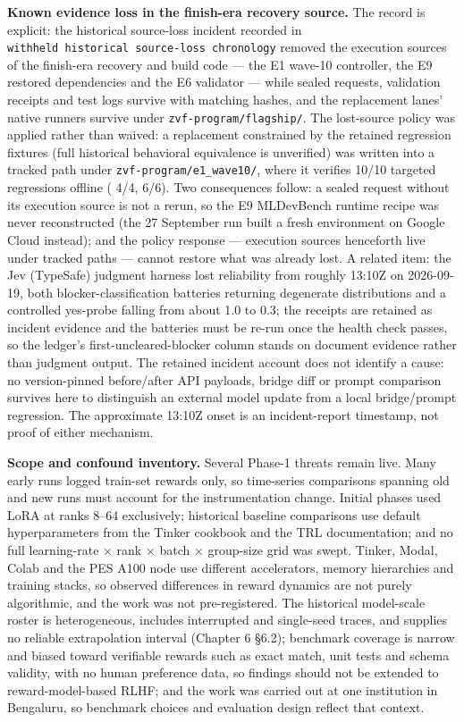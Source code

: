 \documentclass[12pt,a4paper]{report}
\DeclareRobustCommand{\longtok}[1]{\texttt{\seqsplit{#1}}}
\begin{document}
\textbf{Known evidence loss in the finish-era recovery source.} The
record is explicit: the historical source-loss incident recorded in
\texttt{withheld\ historical\ source-loss\ chronology} removed the
execution sources of the finish-era recovery and build code --- the E1
wave-10 controller, the E9 restored dependencies and the E6 validator
--- while sealed requests, validation receipts and test logs survive
with matching hashes, and the replacement lanes' native runners survive
under \texttt{zvf-program/flagship/}. The lost-source policy was applied
rather than waived: a replacement constrained by the retained regression
fixtures (full historical behavioral equivalence is unverified) was
written into a tracked path under \texttt{zvf-program/e1\_wave10/},
where it verifies 10/10 targeted regressions offline
(\longtok{test\_\allowbreak{}process\_\allowbreak{}group.py} 4/4,
\longtok{test\_\allowbreak{}cleanup\_\allowbreak{}regressions.py} 6/6). Two consequences follow: a
sealed request without its execution source is not a rerun, so the E9
MLDevBench runtime recipe was never reconstructed (the 27 September run
built a fresh environment on Google Cloud instead); and the policy
response --- execution sources henceforth live under tracked paths ---
cannot restore what was already lost. A related item: the Jev (TypeSafe)
judgment harness lost reliability from roughly 13:10Z on 2026-09-19,
both blocker-classification batteries returning degenerate distributions
and a controlled yes-probe falling from about 1.0 to 0.3; the receipts
are retained as incident evidence and the batteries must be re-run once
the health check passes, so the ledger's first-uncleared-blocker column
stands on document evidence rather than judgment output. The retained
incident account does not identify a cause: no version-pinned
before/after API payloads, bridge diff or prompt comparison survives
here to distinguish an external model update from a local bridge/prompt
regression. The approximate 13:10Z onset is an incident-report
timestamp, not proof of either mechanism.

\textbf{Scope and confound inventory.} Several Phase-1 threats remain
live. Many early runs logged train-set rewards only, so time-series
comparisons spanning old and new runs must account for the
instrumentation change. Initial phases used LoRA at ranks 8--64
exclusively; historical baseline comparisons use default hyperparameters
from the Tinker cookbook and the TRL documentation; and no full
learning-rate × rank × batch × group-size grid was swept. Tinker, Modal,
Colab and the PES A100 node use different accelerators, memory
hierarchies and training stacks, so observed differences in reward
dynamics are not purely algorithmic, and the work was not
pre-registered. The historical model-scale roster is heterogeneous,
includes interrupted and single-seed traces, and supplies no reliable
extrapolation interval (Chapter 6 §6.2); benchmark coverage is narrow
and biased toward verifiable rewards such as exact match, unit tests and
schema validity, with no human preference data, so findings should not
be extended to reward-model-based RLHF; and the work was carried out at
one institution in Bengaluru, so benchmark choices and evaluation design
reflect that context.
\end{document}
